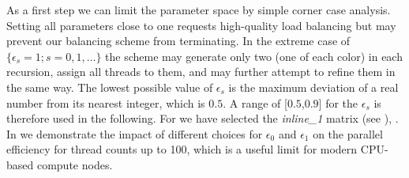 As a first step we can limit the parameter space by simple corner case
analysis. Setting all parameters close to one requests high-quality load
balancing but may prevent our balancing scheme from terminating. In the extreme
case of $\{\epsilon_s=1; s=0,1,\ldots\}$ the scheme may generate only
two \levelGroups (one of each color) in each recursion, assign all threads to
them, and may further attempt to refine them in the same way.  The lowest
possible value of $\epsilon_s$ is the maximum deviation of a real number from
its nearest integer, which is $0.5$. A range of [$0.5$,$0.9$] for the
$\epsilon_s$ is therefore used in the following. For 
 we have
selected the \emph{inline\_1} matrix (see ), . In  we demonstrate the impact of
different choices for $\epsilon_0$ and $\epsilon_1$ on the parallel efficiency
for thread counts up to 100, which is a useful limit for modern CPU-based
compute nodes.
%
